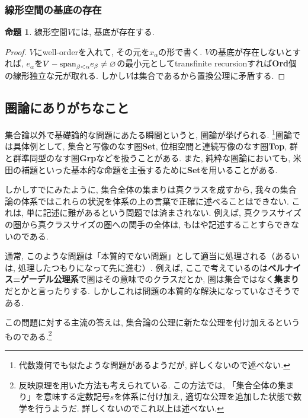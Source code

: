 \documentclass[a4paper, twoside]{bxjsarticle}
\theoremstyle{definition}
\newtheorem{prop}[thm]{命題}
\begin{document}
    \subsubsection{線形空間の基底の存在}
        \begin{prop}
            線形空間$V$には, 基底が存在する.
        \end{prop}
        \begin{proof}
            $V$にwell-orderを入れて, その元を$x_\alpha$の形で書く. $V$の基底が存在しないとすれば, $e_\alpha$を$V-{\rm span}_{\beta<\alpha}e_\beta\neq\varnothing$の最小元としてtransfinite recursionすれば\textbf{Ord}個の線形独立な元が取れる. しかし$V$は集合であるから置換公理に矛盾する.
        \end{proof}
    \subsection{圏論にありがちなこと}
        集合論以外で基礎論的な問題にあたる瞬間というと, 圏論が挙げられる. \footnote{代数幾何でも似たような問題があるようだが, 詳しくないので述べない.}圏論では具体例として, 集合と写像のなす圏\textbf{Set}, 位相空間と連続写像のなす圏\textbf{Top}, 群と群準同型のなす圏\textbf{Grp}などを扱うことがある. また, 純粋な圏論においても,  米田の補題といった基本的な命題を主張するために\textbf{Set}を用いることがある. 
        
        しかしすでにみたように, 集合全体の集まりは真クラスを成すから, 我々の集合論の体系ではこれらの状況を体系の上の言葉で正確に述べることはできない. これは, 単に記述に難があるという問題では済まされない. 例えば, 真クラスサイズの圏から真クラスサイズの圏への関手の全体は, もはや記述することすらできないのである.
        
        通常, このような問題は「本質的でない問題」として適当に処理される（あるいは, 処理したつもりになって先に進む）. 例えば, ここで考えているのは\textbf{ベルナイス=ゲーデル公理系}で圏はその意味でのクラスだとか, 圏は集合ではなく\textbf{集まり}だとかと言ったりする. しかしこれは問題の本質的な解決になっていなさそうである.
        
        この問題に対する主流の答えは, 集合論の公理に新たな公理を付け加えるというものである.\footnote{反映原理を用いた方法も考えられている. この方法では, 「集合全体の集まり」を意味する定数記号$s$を体系に付け加え, 適切な公理を追加した状態で数学を行うようだ. 詳しくないのでこれ以上は述べない.}
        
\end{document}
